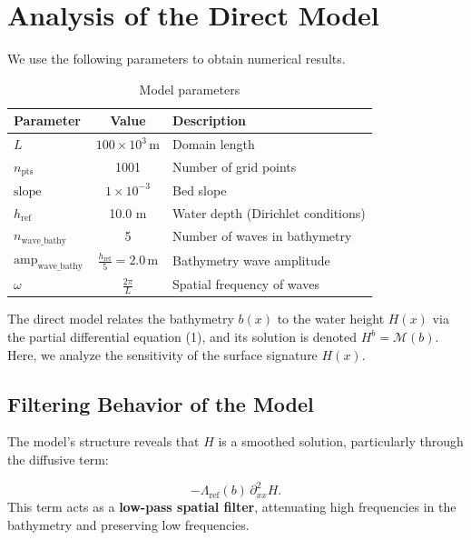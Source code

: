 \documentclass{article}
\begin{document}
\section{Analysis of the Direct Model}

We use the following parameters to obtain numerical results.

\begin{table}[H]
\centering
\begin{tabular}{|l|c|l|}
\hline
\textbf{Parameter} & \textbf{Value} & \textbf{Description} \\
\hline
\( L \) & \( 100 \times 10^3 \, \text{m} \) & Domain length \\
\( n_{\text{pts}} \) & 1001 & Number of grid points \\
\( \text{slope} \) & \( 1 \times 10^{-3} \) & Bed slope \\
\( h_{\text{ref}} \) & 10.0 m & Water depth (Dirichlet conditions) \\
\( n_{\text{wave\_bathy}} \) & 5 & Number of waves in bathymetry \\
\( \text{amp}_{\text{wave\_bathy}} \) & \( \frac{h_{\text{ref}}}{5} = 2.0 \, \text{m} \) & Bathymetry wave amplitude \\
\( \omega \) & \( \frac{2\pi}{L} \) & Spatial frequency of waves \\
\hline
\end{tabular}
\caption{Model parameters}
\label{tab:parametres}
\end{table}

The direct model relates the bathymetry \( b(x) \) to the water height \( H(x) \) via the partial differential equation (1), and its solution is denoted \( H^b = \mathcal{M}(b) \). Here, we analyze the sensitivity of the surface signature \( H(x) \).

\subsection{Filtering Behavior of the Model}

The model's structure reveals that \( H \) is a smoothed solution, particularly through the diffusive term:

\[
-\Lambda_{\text{ref}}(b)\,\partial_{xx}^2 H.
\]
This term acts as a \textbf{low-pass spatial filter}, attenuating high frequencies in the bathymetry and preserving low frequencies.
\end{document}
